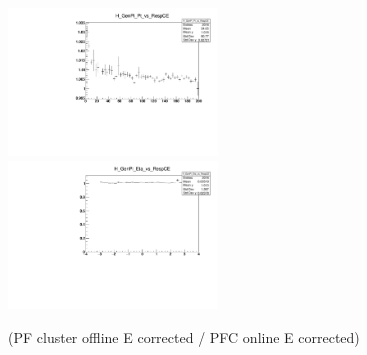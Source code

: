 \begin{figure}
\includegraphics[width=0.495\textwidth]{./plots_pdf/ECAL_plots/Prod6/NoPU/H_GenPi_Pt_vs_RespCE.pdf}
\includegraphics[width=0.495\textwidth]{./plots_pdf/ECAL_plots/Prod6/NoPU/H_GenPi_Eta_vs_RespCE.pdf}
\caption{(PF cluster offline E corrected / PFC online E corrected)}
\label{fig:NoPU_ECAL_Offline_vs_Online_CE}
\end{figure}                                                                                                                                                                       

